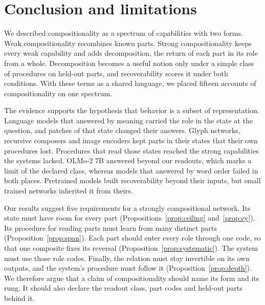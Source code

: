 \section{Conclusion and limitations}
\label{sec:discussion}

We described compositionality as a spectrum of capabilities with two forms. Weak compositionality recombines known parts. Strong compositionality keeps every weak capability and adds decomposition, the return of each part in its role from a whole. Decomposition becomes a useful notion only under a simple class of procedures on held-out parts, and recoverability scores it under both conditions. With these terms as a shared language, we placed fifteen accounts of compositionality on one spectrum.

The evidence supports the hypothesis that behavior is a subset of representation. Language models that answered by meaning carried the role in the state at the question, and patches of that state changed their answers. Glyph networks, recursive composers and image encoders kept parts in their states that their own procedures lost. Procedures that read those states reached the strong capabilities the systems lacked. OLMo-2 7B answered beyond our readouts, which marks a limit of the declared class, whereas models that answered by word order failed in both places. Pretrained models built recoverability beyond their inputs, but small trained networks inherited it from theirs.

Our results suggest five requirements for a strongly compositional network. Its state must have room for every part (Propositions~\ref{prop:ceiling} and~\ref{prop:ey}). Its procedure for reading parts must learn from many distinct parts (Proposition~\ref{prop:span}). Each part should enter every role through one code, so that one composite fixes its reversal (Proposition~\ref{prop:systematic}). The system must use those role codes. Finally, the relation must stay invertible on its own outputs, and the system's procedure must follow it (Proposition~\ref{prop:depth}). We therefore argue that a claim of compositionality should name its form and its rung. It should also declare the readout class, part codes and held-out parts behind it.

